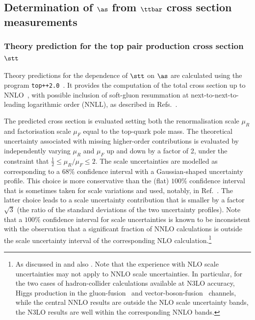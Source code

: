 \subsection{Determination of $\as$ from $\ttbar$ cross section measurements}

\subsubsection{Theory prediction for the top pair production cross section $\stt$}
\label{sec:theory-predictions}

Theory predictions for the dependence of $\stt$ on $\as$ are
calculated using the program
\texttt{top++2.0}~\cite{Czakon:2011xx}. 
%
It provides the computation of the total cross section up to
NNLO~\cite{Czakon:2013goa}, with possible inclusion of soft-gluon
resummation at next-to-next-to-leading logarithmic order (NNLL), as
described in Refs.~\cite{Beneke:2009rj,Czakon:2009zw}.

The predicted cross section is evaluated setting both the
renormalisation scale $\mu_R$ and factorisation scale $\mu_F$ equal to
the top-quark pole mass. 
%
The theoretical uncertainty associated with missing higher-order
contributions is evaluated by independently varying $\mu_R$ and $\mu_F$
up and down by a factor of 2, under the constraint that
$\frac{1}{2} \leq \mu_R / \mu_F \leq 2$.
%
The scale uncertainties are modelled as corresponding to a $68\%$
confidence interval with a Gaussian-shaped uncertainty profile.
%
This choice is more conservative than the (flat) $100\%$ confidence
interval that is sometimes taken for scale variations and used,
notably, in Ref.~\cite{Chatrchyan:2013haa}. 
%
The latter choice leads to a scale
uncertainty contribution that is smaller by a factor $\sqrt{3}$ (the
ratio of the standard deviations of the two uncertainty profiles).
%
Note that a $100\%$ confidence
interval for scale uncertainties is known to be inconsistent with the
observation that a significant fraction of NNLO calculations is
outside the scale uncertainty interval of the corresponding NLO
calculation.\footnote{As discussed in \cite{Bagnaschi:2014wea} and
  also \cite{GavinLHCPtalk}. 
  Note that the experience with NLO scale uncertainties may not apply
  to NNLO scale uncertainties.
  In particular, for the two cases of hadron-collider calculations
  available at N3LO accuracy, Higgs production in the
  gluon-fusion~\cite{Anastasiou:2016cez} and
  vector-boson-fusion~\cite{Dreyer:2016oyx} channels, while the
  central NNLO results are outside the NLO scale uncertainty bands, the N3LO
  results are well within the corresponding NNLO bands. }


